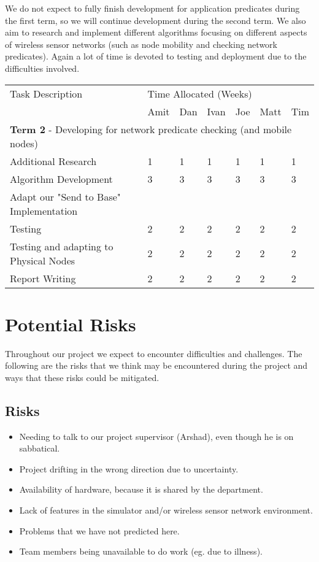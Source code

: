 \documentclass[a4paper]{article}
\begin{document}
We do not expect to fully finish development for application predicates during the first term, so we will continue development during the second term. We also aim to research and implement different algorithms focusing on different aspects of wireless sensor networks (such as node mobility and checking network predicates). Again a lot of time is devoted to testing and deployment due to the difficulties involved.

\begin{table}[H]
	\centering
	\begin{tabular}{| l | l | l | l | l | l | l |}
	Task Description & \multicolumn{6}{|l|}{Time Allocated (Weeks)}\\
	~ & Amit & Dan & Ivan & Joe & Matt & Tim \\
	\hline
	\hline
	\multicolumn{7}{|l|}{\textbf{Term 2} - Developing for network predicate checking (and mobile nodes)} \\
	\hline
	
	Additional Research & 1 & 1 & 1 & 1 & 1 & 1\\
	Algorithm Development & 3 & 3 & 3 & 3 & 3 & 3\\
	Adapt our "Send to Base" Implementation & ~ & ~ & ~ & ~ & ~ & ~\\
	Testing & 2 & 2 & 2 & 2 & 2 & 2\\
	Testing and adapting to Physical Nodes & 2 & 2 & 2 & 2 & 2 & 2\\
	Report Writing & 2 & 2 & 2 & 2 & 2 & 2\\
	
	\hline
	
	\end{tabular}
\end{table}


\section{Potential Risks}

Throughout our project we expect to encounter difficulties and challenges. The following are the risks that we think may be encountered during the project and ways that these risks could be mitigated.


\subsection{Risks}
\begin{itemize}
	\item Needing to talk to our project supervisor (Arshad), even though he is on sabbatical.
	\item Project drifting in the wrong direction due to uncertainty.
	\item Availability of hardware, because it is shared by the department.
	\item Lack of features in the simulator and/or wireless sensor network environment.
	\item Problems that we have not predicted here.
	\item Team members being unavailable to do work (eg. due to illness).
\end{itemize}
\end{document}

